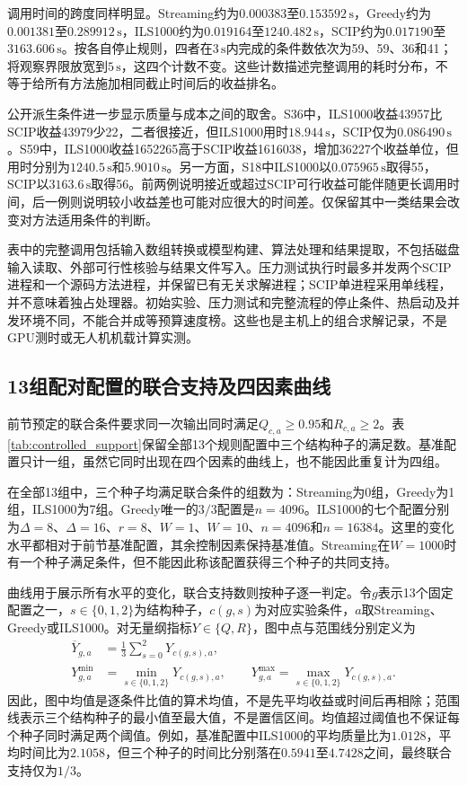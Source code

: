 调用时间的跨度同样明显。Streaming约为$0.000383$至$0.153592\,\mathrm{s}$，Greedy约为$0.001381$至$0.289912\,\mathrm{s}$，ILS1000约为$0.019164$至$1240.482\,\mathrm{s}$，SCIP约为$0.017190$至$3163.606\,\mathrm{s}$。按各自停止规则，四者在$3\,\mathrm{s}$内完成的条件数依次为59、59、36和41；将观察界限放宽到$5\,\mathrm{s}$，这四个计数不变。这些计数描述完整调用的耗时分布，不等于给所有方法施加相同截止时间后的收益排名。

公开派生条件进一步显示质量与成本之间的取舍。S36中，ILS1000收益43957比SCIP收益43979少22，二者很接近，但ILS1000用时$18.944\,\mathrm{s}$，SCIP仅为$0.086490\,\mathrm{s}$。S59中，ILS1000收益1652265高于SCIP收益1616038，增加36227个收益单位，但用时分别为$1240.5\,\mathrm{s}$和$5.9010\,\mathrm{s}$。另一方面，S18中ILS1000以$0.075965\,\mathrm{s}$取得55，SCIP以$3163.6\,\mathrm{s}$取得56。前两例说明接近或超过SCIP可行收益可能伴随更长调用时间，后一例则说明较小收益差也可能对应很大的时间差。仅保留其中一类结果会改变对方法适用条件的判断。

表中的完整调用包括输入数组转换或模型构建、算法处理和结果提取，不包括磁盘输入读取、外部可行性核验与结果文件写入。压力测试执行时最多并发两个SCIP进程和一个源码方法进程，并保留已有无关求解进程；SCIP单进程采用单线程，并不意味着独占处理器。初始实验、压力测试和完整流程的停止条件、热启动及并发环境不同，不能合并成等预算速度榜。这些也是主机上的组合求解记录，不是GPU测时或无人机机载计算实测。

\subsection{13组配对配置的联合支持及四因素曲线}

前节预定的联合条件要求同一次输出同时满足$Q_{c,a}\geq0.95$和$R_{c,a}\geq2$。表\ref{tab:controlled_support}保留全部13个规则配置中三个结构种子的满足数。基准配置只计一组，虽然它同时出现在四个因素的曲线上，也不能因此重复计为四组。



在全部13组中，三个种子均满足联合条件的组数为：Streaming为0组，Greedy为1组，ILS1000为7组。Greedy唯一的$3/3$配置是$n=4096$。ILS1000的七个配置分别为$\Delta=8$、$\Delta=16$、$r=8$、$W=1$、$W=10$、$n=4096$和$n=16384$。这里的变化水平都相对于前节基准配置，其余控制因素保持基准值。Streaming在$W=1000$时有一个种子满足条件，但不能因此称该配置获得三个种子的共同支持。

曲线用于展示所有水平的变化，联合支持数则按种子逐一判定。令$g$表示13个固定配置之一，$s\in\{0,1,2\}$为结构种子，$c(g,s)$为对应实验条件，$a$取Streaming、Greedy或ILS1000。对无量纲指标$Y\in\{Q,R\}$，图中点与范围线分别定义为
\begin{align}
 \overline{Y}_{g,a}
 &=\frac{1}{3}\sum_{s=0}^{2}Y_{c(g,s),a},
 \label{s0307:curve_mean}\\
 Y_{g,a}^{\min}
 &=\min_{s\in\{0,1,2\}}Y_{c(g,s),a},\qquad
 Y_{g,a}^{\max}
 =\max_{s\in\{0,1,2\}}Y_{c(g,s),a}.
 \label{s0307:curve_range}
\end{align}
因此，图中均值是逐条件比值的算术均值，不是先平均收益或时间后再相除；范围线表示三个结构种子的最小值至最大值，不是置信区间。均值超过阈值也不保证每个种子同时满足两个阈值。例如，基准配置中ILS1000的平均质量比为$1.0128$，平均时间比为$2.1058$，但三个种子的时间比分别落在$0.5941$至$4.7428$之间，最终联合支持仅为$1/3$。

